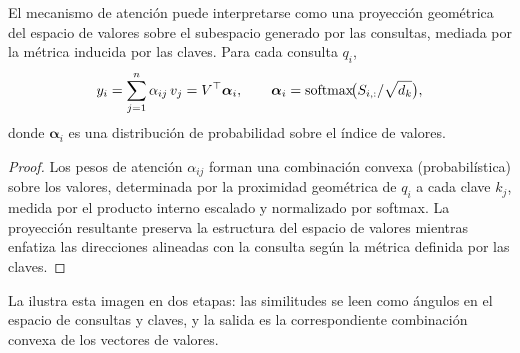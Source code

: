 \begin{theorem}
\label{thm:apps:geom-projection}
El mecanismo de atenci\'on puede interpretarse como una proyecci\'on geom\'etrica
del espacio de valores sobre el subespacio generado por las consultas, mediada
por la m\'etrica inducida por las claves. Para cada consulta $q_i$,
\[
  y_i = \sum_{j=1}^{n} \alpha_{ij}\, v_j = V^\top \boldsymbol{\alpha}_i,
  \qquad
  \boldsymbol{\alpha}_i = \operatorname{softmax}\!\bigl(S_{i,:}/\sqrt{d_k}\bigr),
\]
donde $\boldsymbol{\alpha}_i$ es una distribuci\'on de probabilidad sobre el
\'indice de valores.
\end{theorem}

\begin{proof}
Los pesos de atenci\'on $\alpha_{ij}$ forman una combinaci\'on convexa
(probabil\'istica) sobre los valores, determinada por la proximidad geom\'etrica
de $q_i$ a cada clave $k_j$, medida por el producto interno escalado y
normalizado por softmax. La proyecci\'on resultante preserva la estructura del
espacio de valores mientras enfatiza las direcciones alineadas con la consulta
seg\'un la m\'etrica definida por las claves.
\end{proof}

La  ilustra esta imagen en dos etapas: las similitudes se
leen como \'angulos en el espacio de consultas y claves, y la salida es la
correspondiente combinaci\'on convexa de los vectores de valores.

